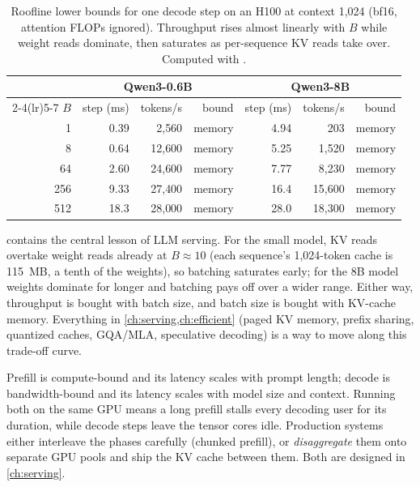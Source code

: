 \begin{table}[ht]
\centering\small
\caption{Roofline lower bounds for one decode step on an H100 at context 1,024 (bf16, attention FLOPs ignored).
Throughput rises almost linearly with $B$ while weight reads dominate, then saturates as per-sequence KV
reads take over. Computed with .}
\label{tab:inference:decode}
\begin{tabular}{rrrrrrr}
\toprule
 & \multicolumn{3}{c}{Qwen3-0.6B} & \multicolumn{3}{c}{Qwen3-8B}\\
\cmidrule(lr){2-4}\cmidrule(lr){5-7}
$B$ & step (ms) & tokens/s & bound & step (ms) & tokens/s & bound\\
\midrule
1   & 0.39 & 2{,}560   & memory & 4.94  & 203    & memory\\
8   & 0.64 & 12{,}600  & memory & 5.25  & 1{,}520  & memory\\
64  & 2.60 & 24{,}600  & memory & 7.77  & 8{,}230  & memory\\
256 & 9.33 & 27{,}400  & memory & 16.4  & 15{,}600 & memory\\
512 & 18.3 & 28{,}000  & memory & 28.0  & 18{,}300 & memory\\
\bottomrule
\end{tabular}
\end{table}

 contains the central lesson of LLM serving. For the small model, KV
reads overtake weight reads already at $B\approx10$ (each sequence's 1,024-token cache is
\SI{115}{MB}, a tenth of the weights), so batching saturates early; for the 8B model weights dominate
for longer and batching pays off over a wider range. Either way, throughput is bought with batch
size, and batch size is bought with KV-cache memory. Everything in \cref{ch:serving,ch:efficient}
(paged KV memory, prefix sharing, quantized caches, GQA/MLA, speculative decoding) is a way to move
along this trade-off curve.

\begin{systemslens}
Prefill is compute-bound and its latency scales with prompt length; decode is bandwidth-bound and
its latency scales with model size and context. Running both on the same GPU means a long prefill
stalls every decoding user for its duration, while decode steps leave the tensor cores idle.
Production systems either interleave the phases carefully (chunked prefill), or
\emph{disaggregate} them onto separate GPU pools and ship the KV cache between them. Both are
designed in \cref{ch:serving}.
\end{systemslens}

